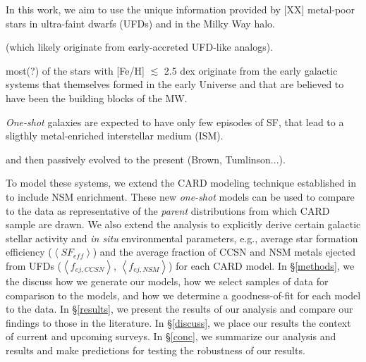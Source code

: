 In this work, we aim to use the unique information provided by [XX] metal-poor stars in ultra-faint dwarfs (UFDs) and in the Milky Way halo.

(which likely originate from early-accreted UFD-like analogs). 

most(?) of the stars with [Fe/H] $\lesssim$ 2.5 dex originate from the early galactic systems that themselves formed in the early Universe and that are believed to have been the building blocks of the MW.


{\it One-shot} galaxies are expected to have only few episodes of SF, that lead to a sligthly metal-enriched interstellar medium (ISM).


and then passively evolved to the present (Brown, Tumlinson...). 

To model these systems, we extend the CARD modeling technique established in \citet{Lee_2013} to include NSM enrichment. These new {\it one-shot} models can be used to compare to the data as representative of the {\it parent} distributions from which CARD sample are drawn. We also extend the \citet{Lee_2013} analysis to explicitly derive certain galactic stellar activity and {\it in situ} environmental parameters, e.g., average star formation efficiency ($\left<SF_{eff}\right>$) and the average fraction of CCSN and NSM metals ejected from UFDs ($\left<f_{ej,CCSN}\right>$, $\left<f_{ej,NSM}\right>$) for each CARD model. In \S\ref{methods}, we the discuss how we generate our models, how we select samples of data for comparison to the models, and how we determine a goodness-of-fit for each model to the data. In \S\ref{results}, we present the results of our analysis and compare our findings to those in the literature. In \S\ref{discuss}, we place our results the context of current and upcoming surveys. In \S\ref{conc}, we summarize our analysis and results and make predictions for testing the robustness of our results.